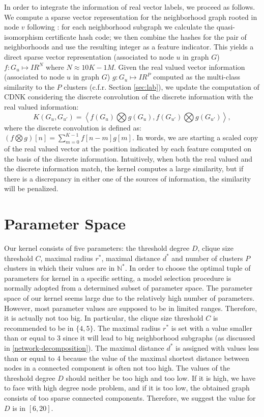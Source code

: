 \documentclass[review]{elsarticle}
\begin{document}
In order to integrate the information of real vector labels, we proceed as follows. We compute a sparse vector representation for the neighborhood graph rooted in node $v$ following \cite{costa2010fast}: for each neighborhood subgraph we calculate the quasi-isomorphism certificate hash code; we then combine the hashes for the pair of neighborhoods and use the resulting integer as a feature indicator. This yields a direct sparse vector representation (associated to node $u$ in graph $G$) $f: G_u \longmapsto I\!R^N$ where $N \approx 10K-1M$. Given the real valued vector information (associated to node $u$ in graph $G$) $g: G_u \longmapsto I\!R^P$ computed as the multi-class similarity to the $P$ clusters (c.f.r. Section \ref{sec:lab}), we update the computation of CDNK considering the discrete convolution of the discrete information with the real valued information:   
\begin{equation}
K(G_u,G_{u'}) = \left< f(G_u) \bigotimes g(G_u), f(G_{u'}) \bigotimes g(G_{u'}) \right>,
\end{equation}
where the discrete convolution is defined as: 
$(f \bigotimes g)[n]=\sum _{m=0}^{K-1}f[n-m]g[m].$
In words, we are starting a scaled copy of the real valued vector at the position indicated by each feature computed on the basis of the discrete information. Intuitively, when both the real valued and the discrete information match, the kernel computes a large similarity, but if there is a discrepancy in either one of the sources of information, the similarity will be penalized. 

\section{Parameter Space}
Our kernel consists of five parameters: the threshold degree $D$, clique size threshold $C$, maximal radius $r^*$, maximal distance $d^*$ and number of clusters $P$ clusters in which their values are in $\mathbb{N}^*$. In order to choose the optimal tuple of parameters for kernel in a specific setting, a model selection procedure is normally adopted from a determined subset of parameter space. The parameter space of our kernel seems large due to the relatively high number of parameters. However, most parameter values are supposed to be in limited ranges. Therefore, it is actually not too big. In particular, the clique size threshold $C$ is recommended to be in $\lbrace 4, 5\rbrace$. The maximal radius $r^*$ is set with a value smaller than or equal to $3$ since it will lead to big neighborhood subgraphs (as discussed in \ref{network-decomposition}). The maximal distance $d^*$ is assigned with values less than or equal to $4$ because the value of the maximal shortest distance between nodes in a connected component is often not too high. The values of the threshold degree $D$ should neither be too high and too low. If it is high, we have to face with high degree node problem, and if it is too low, the obtained graph consists of too sparse connected components. Therefore, we suggest the value for $D$ is in $\left[6, 20 \right]$. 
\end{document}

